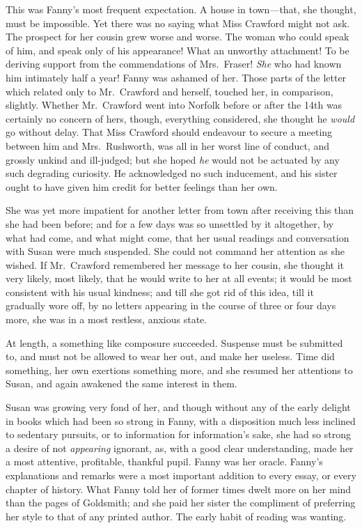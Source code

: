 This was Fanny's most frequent expectation.  A house
in town---that, she thought, must be impossible.
Yet there was no saying what Miss Crawford might not ask.
The prospect for her cousin grew worse and worse.
The woman who could speak of him, and speak only of
his appearance!  What an unworthy attachment!  To be
deriving support from the commendations of Mrs.\ Fraser!
\emph{She} who had known him intimately half a year!
Fanny was ashamed of her.  Those parts of the letter which
related only to Mr.\ Crawford and herself, touched her,
in comparison, slightly.  Whether Mr.\ Crawford went
into Norfolk before or after the 14th was certainly
no concern of hers, though, everything considered,
she thought he \emph{would} go without delay.  That Miss
Crawford should endeavour to secure a meeting between him
and Mrs.\ Rushworth, was all in her worst line of conduct,
and grossly unkind and ill-judged; but she hoped \emph{he}
would not be actuated by any such degrading curiosity.
He acknowledged no such inducement, and his sister
ought to have given him credit for better feelings than
her own.

She was yet more impatient for another letter from
town after receiving this than she had been before;
and for a few days was so unsettled by it altogether,
by what had come, and what might come, that her usual
readings and conversation with Susan were much suspended.
She could not command her attention as she wished.
If Mr.\ Crawford remembered her message to her cousin,
she thought it very likely, most likely, that he would write
to her at all events; it would be most consistent with his
usual kindness; and till she got rid of this idea, till it
gradually wore off, by no letters appearing in the course
of three or four days more, she was in a most restless,
anxious state.

At length, a something like composure succeeded.
Suspense must be submitted to, and must not be allowed
to wear her out, and make her useless.  Time did something,
her own exertions something more, and she resumed her
attentions to Susan, and again awakened the same interest
in them.

Susan was growing very fond of her, and though without
any of the early delight in books which had been
so strong in Fanny, with a disposition much less
inclined to sedentary pursuits, or to information for
information's sake, she had so strong a desire of not
\emph{appearing} ignorant, as, with a good clear understanding,
made her a most attentive, profitable, thankful pupil.
Fanny was her oracle.  Fanny's explanations and remarks
were a most important addition to every essay, or every
chapter of history.  What Fanny told her of former times
dwelt more on her mind than the pages of Goldsmith; and she
paid her sister the compliment of preferring her style
to that of any printed author.  The early habit of reading was
wanting.

